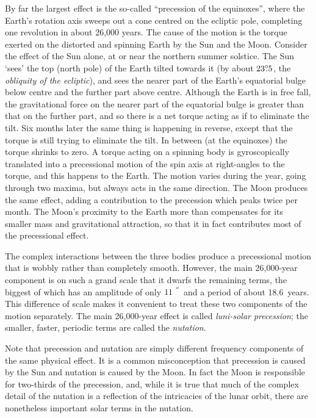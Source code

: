 \documentclass[11pt,twoside,nolof]{starlink}
\providecommand{\degree}[2] {$#1^{\circ}
                        \hspace{-0.37em}.\hspace{0.02em}#2$}
\providecommand{\arcseci}[1] {$#1\hspace{-0.05em}$\raisebox{-0.5ex}
                         {$^{'\hspace{-0.1em}'}$}}
\begin{document}
By far the largest effect is the
so-called ``precession of the equinoxes'', where the Earth's
rotation axis sweeps out a cone centred on the ecliptic
pole, completing one revolution in about 26,000 years.  The
cause of the motion is the torque exerted on the distorted and
spinning Earth by the Sun and the Moon.  Consider the effect of the
Sun alone, at or near the northern summer solstice.  The Sun
`sees' the top (north pole) of the Earth tilted towards it
(by about \degree{23}{5}, the \textit{obliquity of the
ecliptic}\/),
and sees the nearer part of the Earth's equatorial bulge
below centre and the further part above centre.
Although the Earth is in free fall,
the gravitational force on the nearer part of the
equatorial bulge is greater than that on the further part, and
so there is a net torque acting
as if to eliminate the tilt.  Six months later the same thing
is happening in reverse, except that the torque is still
trying to eliminate the tilt.  In between (at the equinoxes) the
torque shrinks to zero.  A torque acting on a spinning body
is gyroscopically translated
into a precessional motion of the spin axis at right-angles to the torque,
and this happens to the Earth.
The motion varies during the
year, going through two maxima, but always acts in the
same direction.  The Moon produces the same effect,
adding a contribution to the precession which peaks twice
per month.  The Moon's proximity to the Earth more than compensates
for its smaller mass and gravitational attraction, so that it
in fact contributes most of the precessional effect.

The complex interactions between the three bodies produce a
precessional motion that is wobbly rather than completely smooth.
However, the main 26,000-year component is on such a grand scale that
it dwarfs the remaining terms, the biggest of
which has an amplitude of only \arcseci{11} and a period of
about 18.6~years.  This difference of scale makes it convenient to treat
these two components of the motion separately.  The main 26,000-year
effect is called \textit{luni-solar precession};  the smaller,
faster, periodic terms are called the \textit{nutation}.

Note that precession and nutation are simply
different frequency components of the same physical effect.  It is
a common misconception that precession is caused
by the Sun and nutation is caused by the Moon.  In fact
the Moon is responsible for two-thirds of the precession, and,
while it is true that much of the complex detail of the nutation is
a reflection of the intricacies of the lunar orbit, there are
nonetheless important solar terms in the nutation.
\end{document}
